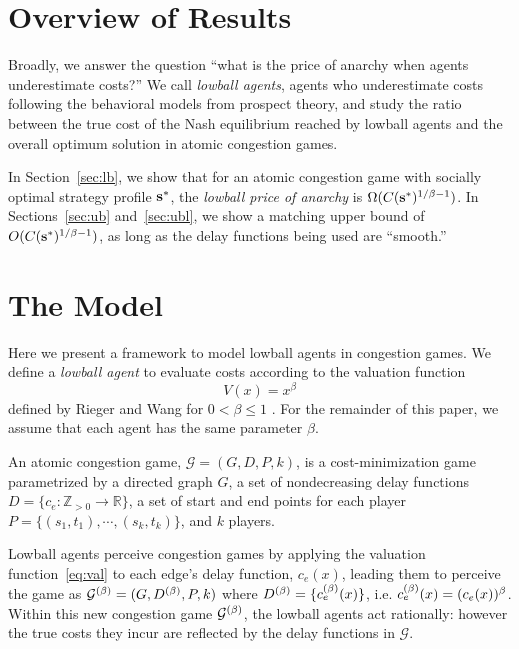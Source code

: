 \documentclass[twoside]{article}
\begin{document}
\begin{multicols}{2}
\section{Overview of Results}
Broadly, we answer the question ``what is the price of anarchy when agents
underestimate costs?'' We call \textit{lowball agents}, agents who underestimate
costs following the behavioral models from prospect theory, and study the ratio between the true cost of the Nash equilibrium reached by lowball agents and the overall optimum solution in atomic congestion games.

In Section~\ref{sec:lb}, we show that for an atomic congestion game with
socially optimal strategy profile $\mathbf{s}^*$, the \textit{lowball price of anarchy} is
$\Omega(C(\mathbf{s}^*)^{1/\beta-1})$. In Sections~\ref{sec:ub} and~\ref{sec:ubl}, we
show a matching upper bound of $O(C(\mathbf{s}^*)^{1/\beta - 1})$, as long as the delay
functions being used are ``smooth.''

\section{The Model}

Here we present a framework to model lowball agents in congestion games. We define a 
\textit{lowball agent} to evaluate costs according to the valuation function
\begin{equation}
  V(x) = x^{\beta}
  \label{eq:val}
\end{equation}
defined by Rieger and Wang for $0 < \beta \le 1$ \cite{Rieger2008}. For the
remainder of this paper, we assume that each agent has the same parameter
$\beta$.

An atomic congestion game, $\mathcal{G} = (G, D, P, k)$, is a cost-minimization
game parametrized by a directed graph $G$, a set of nondecreasing delay
functions $D = \{c_e : \mathbb{Z}_{>0} \to \mathbb{R}\}$, a set of start and end
points for each player $P =\{(s_1, t_1), \cdots, (s_k, t_k)\}$, and $k$ players.

Lowball agents perceive congestion games by applying the valuation
function~\eqref{eq:val} to each edge's delay function, $c_e(x)$, leading them to
perceive the game as $\mathcal{G}^{(\beta)}= (G, D^{(\beta)}, P, k)$ where $D^{(\beta)} =
\{c_e^{(\beta)}(x)\}$, i.e. $c_e^{(\beta)}(x) = (c_e(x))^\beta$. Within this new
congestion game $\mathcal{G}^{(\beta)}$, the lowball agents act rationally: however
the true costs they incur are reflected by the delay functions in $\mathcal{G}$.   


\end{multicols}
\end{document}
